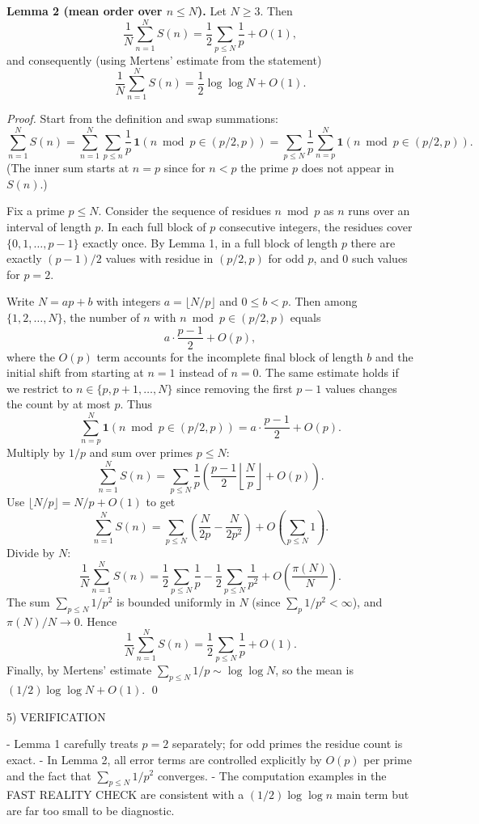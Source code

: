 \medskip

\textbf{Lemma 2 (mean order over $n\le N$).}
Let $N\ge 3$. Then
\[
\frac{1}{N}\sum_{n=1}^N S(n) = \frac12\sum_{p\le N}\frac{1}{p} + O(1),
\]
and consequently (using Mertens' estimate from the statement)
\[
\frac{1}{N}\sum_{n=1}^N S(n) = \frac12\log\log N + O(1).
\]

\emph{Proof.}
Start from the definition and swap summations:
\[
\sum_{n=1}^N S(n)
= \sum_{n=1}^N\sum_{p\le n} \frac{1}{p}\,\mathbf 1(n\bmod p\in(p/2,p))
= \sum_{p\le N}\frac{1}{p}\sum_{n=p}^N \mathbf 1(n\bmod p\in(p/2,p)).
\]
(The inner sum starts at $n=p$ since for $n<p$ the prime $p$ does not appear in $S(n)$.)

Fix a prime $p\le N$. Consider the sequence of residues $n\bmod p$ as $n$ runs over an interval of length $p$.
In each full block of $p$ consecutive integers, the residues cover $\{0,1,\dots,p-1\}$ exactly once.
By Lemma 1, in a full block of length $p$ there are exactly $(p-1)/2$ values with residue in $(p/2,p)$ for odd $p$, and $0$ such values for $p=2$.

Write $N = ap + b$ with integers $a=\lfloor N/p\rfloor$ and $0\le b<p$.
Then among $\{1,2,\dots,N\}$, the number of $n$ with $n\bmod p\in(p/2,p)$ equals
\[
a\cdot \frac{p-1}{2} + O(p),
\]
where the $O(p)$ term accounts for the incomplete final block of length $b$ and the initial shift from starting at $n=1$ instead of $n=0$.
The same estimate holds if we restrict to $n\in\{p,p+1,\dots,N\}$ since removing the first $p-1$ values changes the count by at most $p$.
Thus
\[
\sum_{n=p}^N \mathbf 1(n\bmod p\in(p/2,p)) = a\cdot \frac{p-1}{2} + O(p).
\]
Multiply by $1/p$ and sum over primes $p\le N$:
\[
\sum_{n=1}^N S(n) = \sum_{p\le N} \frac{1}{p}\left(\frac{p-1}{2}\left\lfloor\frac{N}{p}\right\rfloor + O(p)\right).
\]
Use $\lfloor N/p\rfloor = N/p + O(1)$ to get
\[
\sum_{n=1}^N S(n) = \sum_{p\le N}\left(\frac{N}{2p} - \frac{N}{2p^2}\right) + O\left(\sum_{p\le N}1\right).
\]
Divide by $N$:
\[
\frac{1}{N}\sum_{n=1}^N S(n) = \frac12\sum_{p\le N}\frac{1}{p} - \frac12\sum_{p\le N}\frac{1}{p^2} + O\left(\frac{\pi(N)}{N}\right).
\]
The sum $\sum_{p\le N}1/p^2$ is bounded uniformly in $N$ (since $\sum_p1/p^2<\infty$), and $\pi(N)/N\to 0$.
Hence
\[
\frac{1}{N}\sum_{n=1}^N S(n) = \frac12\sum_{p\le N}\frac{1}{p} + O(1).
\]
Finally, by Mertens' estimate $\sum_{p\le N}1/p\sim\log\log N$, so the mean is $(1/2)\log\log N+O(1)$.
\qed

5) VERIFICATION

- Lemma 1 carefully treats $p=2$ separately; for odd primes the residue count is exact.
- In Lemma 2, all error terms are controlled explicitly by $O(p)$ per prime and the fact that $\sum_{p\le N}1/p^2$ converges.
- The computation examples in the FAST REALITY CHECK are consistent with a $(1/2)\log\log n$ main term but are far too small to be diagnostic.

